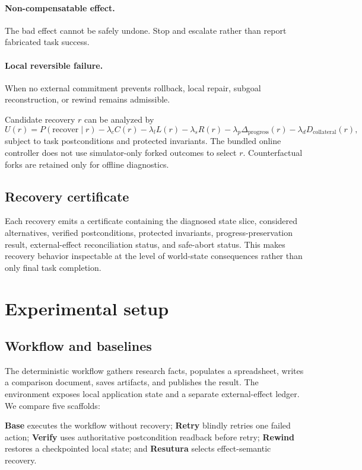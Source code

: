 \documentclass{article}
\begin{document}
\paragraph{Non-compensatable effect.} The bad effect cannot be safely undone. Stop and escalate rather than report fabricated task success.

\paragraph{Local reversible failure.} When no external commitment prevents rollback, local repair, subgoal reconstruction, or rewind remains admissible.

Candidate recovery $r$ can be analyzed by
\begin{equation}
U(r)=P(\mathrm{recover}\mid r)-\lambda_c C(r)-\lambda_l L(r)-\lambda_s R(r)-\lambda_p\Delta_{\mathrm{progress}}(r)-\lambda_d D_{\mathrm{collateral}}(r),
\end{equation}
subject to task postconditions and protected invariants. The bundled online controller does not use simulator-only forked outcomes to select $r$. Counterfactual forks are retained only for offline diagnostics.

\subsection{Recovery certificate}
Each recovery emits a certificate containing the diagnosed state slice, considered alternatives, verified postconditions, protected invariants, progress-preservation result, external-effect reconciliation status, and safe-abort status. This makes recovery behavior inspectable at the level of world-state consequences rather than only final task completion.

\section{Experimental setup}
\subsection{Workflow and baselines}
The deterministic workflow gathers research facts, populates a spreadsheet, writes a comparison document, saves artifacts, and publishes the result. The environment exposes local application state and a separate external-effect ledger. We compare five scaffolds:

\textbf{Base} executes the workflow without recovery; \textbf{Retry} blindly retries one failed action; \textbf{Verify} uses authoritative postcondition readback before retry; \textbf{Rewind} restores a checkpointed local state; and \textbf{Resutura} selects effect-semantic recovery.
\end{document}
